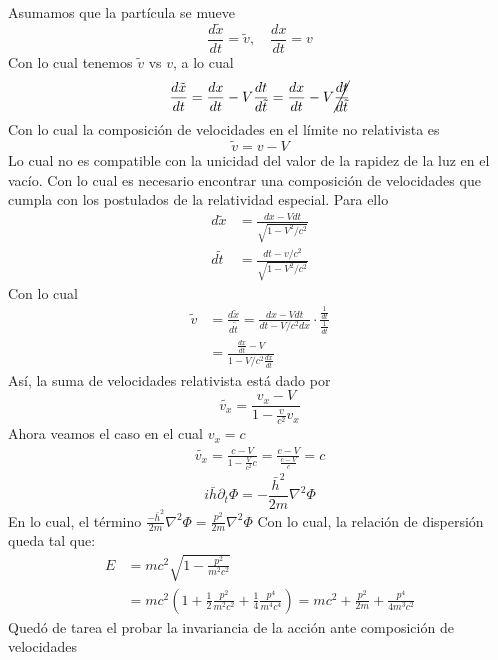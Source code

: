 \documentclass[../main.tex]{subfiles}
\begin{document}
Asumamos que la partícula se mueve
\begin{equation*}
    \frac{d\tilde{x}}{dt}=\tilde{v}, \quad \frac{dx}{dt}=v
\end{equation*}
Con lo cual tenemos $\tilde{v}$ vs $v$, a lo cual
\begin{equation*}
    \frac{d\tilde{x}}{dt}=\frac{dx}{dt}-V\frac{dt}{d\tilde{t}}=\frac{dx}{dt}-V\cancel{\frac{dt}{d\tilde{t}}}
\end{equation*}
Con lo cual la composición de velocidades en el límite no relativista es 
\begin{equation}
    \tilde{v}=v-V
\end{equation}
Lo cual no es compatible con la unicidad del valor de la rapidez de la luz en el vacío. Con lo cual es necesario encontrar una composición de velocidades que cumpla con los postulados de la relatividad especial. Para ello
\begin{align*}
    d\tilde{x} & =\frac{dx-Vdt}{\sqrt{1-V^2/c^2}}\\
    d\tilde{t} & = \frac{dt-v/c^2}{\sqrt{1-V^2/c^2}}
\end{align*}
Con lo cual
\begin{align*}
    \tilde{v}&=\frac{d\tilde{x}}{d\tilde{t}}=\frac{dx-Vdt}{dt-V/c^2dx} \cdot \frac{\frac{1}{dt}}{\frac{1}{dt}} \\
    & = \frac{\frac{dx}{dt}-V}{1-V/c^2\frac{dx}{dt}}
\end{align*}
Así, la suma de velocidades relativista está dado por
\begin{equation}
\tilde{v_x}=\frac{v_x-V}{1-\frac{v}{c^2}v_x}
\end{equation}
Ahora veamos el caso en el cual $v_x=c$ 
\begin{align*}
    \tilde{v_x}=\frac{c-V}{1-\frac{V}{c^2}c} = \frac{c-V}{\frac{c-V}{c}}=c
\end{align*}
\begin{equation}
  i\bar{h} \partial_t \Phi= -\frac{\bar{h}^2}{2m}\nabla^2\Phi
\end{equation}
En lo cual, el término $\frac{-\bar{h}^2}{2m}\nabla^2\Phi=\frac{p^2}{2m}\nabla^2\Phi$
Con lo cual, la relación de dispersión queda tal que: 
\begin{align*}
    E& =mc^2\sqrt{1-\frac{p^2}{m^2c^2}} \\
     & = mc^2\left(  1+\frac{1}{2}\frac{p^2}{m^2c^2} + \frac{1}{4}\frac{p^4}{m^4c^4}\right) = mc^2 + \frac{p^2}{2m} + \frac{p^4}{4m^3c^2}
\end{align*}
Quedó de tarea el probar la invariancia de la acción ante composición de velocidades
\end{document}
